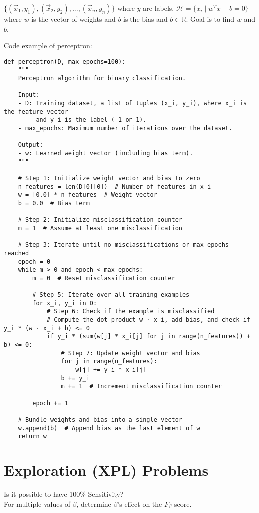 \begin{outline}
        \2 $\{(\vec{x}_1,y_1),(\vec{x}_2,y_2),...,(\vec{x}_n,y_n)\}$ where $y$ are labels.
        \2 $\mathcal{H}=\{x_i\mid w^Tx+b=0\}$ where $w$ is the vector of weights and $b$ is the bias and $b\in\mathbb{R}$.
        \2 Goal is to find $w$ and $b$.

    \1 Code example of perceptron:
    \begin{verbatim}
def perceptron(D, max_epochs=100):
    """
    Perceptron algorithm for binary classification.

    Input:
    - D: Training dataset, a list of tuples (x_i, y_i), where x_i is the feature vector 
         and y_i is the label (-1 or 1).
    - max_epochs: Maximum number of iterations over the dataset.

    Output:
    - w: Learned weight vector (including bias term).
    """
    
    # Step 1: Initialize weight vector and bias to zero
    n_features = len(D[0][0])  # Number of features in x_i
    w = [0.0] * n_features  # Weight vector
    b = 0.0  # Bias term
    
    # Step 2: Initialize misclassification counter
    m = 1  # Assume at least one misclassification
    
    # Step 3: Iterate until no misclassifications or max_epochs reached
    epoch = 0
    while m > 0 and epoch < max_epochs:
        m = 0  # Reset misclassification counter
        
        # Step 5: Iterate over all training examples
        for x_i, y_i in D:
            # Step 6: Check if the example is misclassified
            # Compute the dot product w · x_i, add bias, and check if y_i * (w · x_i + b) <= 0
            if y_i * (sum(w[j] * x_i[j] for j in range(n_features)) + b) <= 0:
                # Step 7: Update weight vector and bias
                for j in range(n_features):
                    w[j] += y_i * x_i[j]
                b += y_i
                m += 1  # Increment misclassification counter
        
        epoch += 1
    
    # Bundle weights and bias into a single vector
    w.append(b)  # Append bias as the last element of w
    return w
\end{verbatim}
    
\end{outline}


\section{Exploration (XPL) Problems}
\begin{outline}[enumerate]

    \1  Is it possible to have 100\% Sensitivity? \\
    \1  For multiple values of $\beta$, determine $\beta$'s effect on the $F_\beta$ score.\\

\end{outline}
